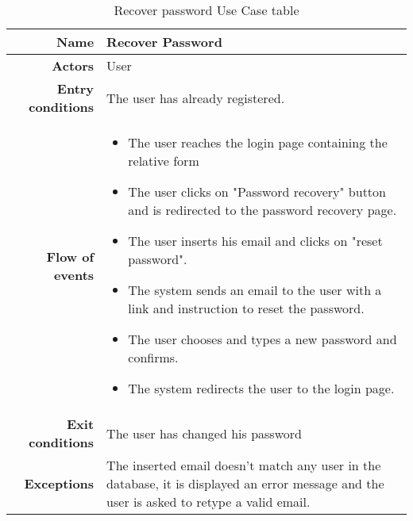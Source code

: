 \begin{table}[htp]
\begin{tabular}{r|p{7cm}}
\bf\large Name&\bf\large Recover Password \\
\hline
\hline
\bf Actors&User\\
\hline
\bf Entry conditions&The user has already registered.\\
\hline
\bf Flow of events&
\begin{itemize}
\item The user reaches the login page containing the relative form
\item The user clicks on "Password recovery" button and is redirected to the password recovery page.
\item The user inserts his email and clicks on "reset password".
\item The system sends an email to the user with a link and instruction to reset the password.
\item The user chooses and types a new password and confirms.
\item The system redirects the user to the login page.
\end{itemize}
\\
\hline
\bf Exit conditions&The user has changed his password \\
\hline
\bf Exceptions&The inserted email doesn't match any user in the database, it is displayed an error message and the user is asked to retype a valid email.\\
\hline

\end{tabular}
\caption{Recover password Use Case table} \label{tab:recoverpassword}
\end{table}